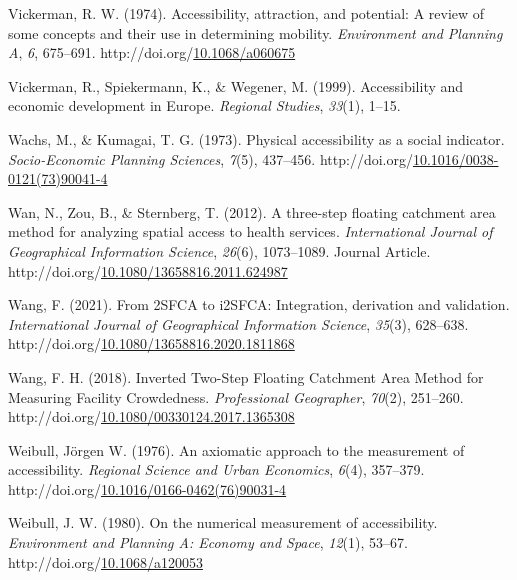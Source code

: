 \documentclass[
11pt, %
oneside, %
english, %
singlespacing, %
]{macthesis} %
\newlength{\cslhangindent}
\newenvironment{CSLReferences}[2] %
{\begin{list}{}{%
	\setlength{\itemindent}{0pt}
	\setlength{\leftmargin}{0pt}
	\setlength{\parsep}{0pt}
	\ifodd #1
	\setlength{\leftmargin}{\cslhangindent}
	\setlength{\itemindent}{-1\cslhangindent}
	\fi
	\setlength{\itemsep}{#2\baselineskip}}}
{\end{list}}
\begin{document}
\begin{CSLReferences}{1}{0}
Vickerman, R. W. (1974). Accessibility, attraction, and potential: A review of some concepts and their use in determining mobility. \emph{Environment and Planning A}, \emph{6}, 675--691. http://doi.org/\href{https://doi.org/10.1068/a060675}{10.1068/a060675}

Vickerman, R., Spiekermann, K., \& Wegener, M. (1999). Accessibility and economic development in {Europe}. \emph{Regional Studies}, \emph{33}(1), 1--15.

Wachs, M., \& Kumagai, T. G. (1973). Physical accessibility as a social indicator. \emph{Socio-Economic Planning Sciences}, \emph{7}(5), 437--456. http://doi.org/\href{https://doi.org/10.1016/0038-0121(73)90041-4}{10.1016/0038-0121(73)90041-4}

Wan, N., Zou, B., \& Sternberg, T. (2012). A three-step floating catchment area method for analyzing spatial access to health services. \emph{International Journal of Geographical Information Science}, \emph{26}(6), 1073--1089. Journal Article. http://doi.org/\href{https://doi.org/10.1080/13658816.2011.624987}{10.1080/13658816.2011.624987}

Wang, F. (2021). From {2SFCA} to {i2SFCA}: Integration, derivation and validation. \emph{International Journal of Geographical Information Science}, \emph{35}(3), 628--638. http://doi.org/\href{https://doi.org/10.1080/13658816.2020.1811868}{10.1080/13658816.2020.1811868}

Wang, F. H. (2018). Inverted {Two}-{Step} {Floating} {Catchment} {Area} {Method} for {Measuring} {Facility} {Crowdedness}. \emph{Professional Geographer}, \emph{70}(2), 251--260. http://doi.org/\href{https://doi.org/10.1080/00330124.2017.1365308}{10.1080/00330124.2017.1365308}

Weibull, Jörgen W. (1976). An axiomatic approach to the measurement of accessibility. \emph{Regional Science and Urban Economics}, \emph{6}(4), 357--379. http://doi.org/\href{https://doi.org/10.1016/0166-0462(76)90031-4}{10.1016/0166-0462(76)90031-4}

Weibull, J. W. (1980). On the numerical measurement of accessibility. \emph{Environment and Planning A: Economy and Space}, \emph{12}(1), 53--67. http://doi.org/\href{https://doi.org/10.1068/a120053}{10.1068/a120053}


\end{CSLReferences}
\end{document}
